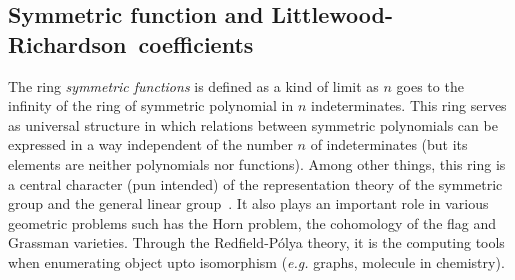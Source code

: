 \documentclass[12pt]{article}
\newcommand{\LR}{Littlewood-Richardson\ }
\newcommand{\eg}{\textit{e.g.}\xspace}
\begin{document}
\subsection{Symmetric function and \LR coefficients}
The ring \emph{symmetric functions} is defined as a kind of limit as $n$ goes
to the infinity of the ring of symmetric polynomial in $n$
indeterminates. This ring serves as universal structure in which relations
between symmetric polynomials can be expressed in a way independent of the
number $n$ of indeterminates (but its elements are neither polynomials nor
functions). Among other things, this ring is a central character (pun
intended) of the representation theory of the symmetric group and the general
linear group~\cite{Macdonald95}. It also plays an important role in various
geometric problems such has the Horn problem, the cohomology of the flag and
Grassman varieties. Through the Redfield-Pólya theory, it is the computing
tools when enumerating object upto isomorphism (\eg graphs, molecule in
chemistry).
\end{document}
